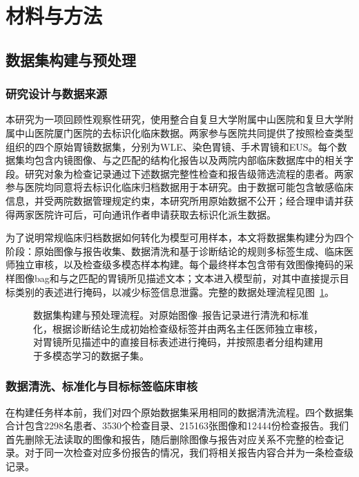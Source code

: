 \documentclass[Afour,sagev,times]{sagej}
\begin{document}
\section{材料与方法}

\subsection{数据集构建与预处理}

\subsubsection{研究设计与数据来源}

本研究为一项回顾性观察性研究，使用整合自复旦大学附属中山医院和复旦大学附属中山医院厦门医院的去标识化临床数据。两家参与医院共同提供了按照检查类型组织的四个原始胃镜数据集，分别为WLE、染色胃镜、手术胃镜和EUS。每个数据集均包含内镜图像、与之匹配的结构化报告以及两院内部临床数据库中的相关字段。研究对象为检查记录通过下述数据完整性检查和报告级筛选流程的患者。两家参与医院均同意将去标识化临床归档数据用于本研究。由于数据可能包含敏感临床信息，并受两院数据管理规定约束，本研究所用原始数据不公开；经合理申请并获得两家医院许可后，可向通讯作者申请获取去标识化派生数据。

为了说明常规临床归档数据如何转化为模型可用样本，本文将数据集构建分为四个阶段：原始图像与报告收集、数据清洗和基于诊断结论的规则多标签生成、临床医师独立审核，以及检查级多模态样本构建。每个最终样本包含带有效图像掩码的采样图像bag和与之匹配的胃镜所见描述文本；文本进入模型前，对其中直接提示目标类别的表述进行掩码，以减少标签信息泄露。完整的数据处理流程见图~\ref{fig:dataset_pipeline}。

\begin{figure}[t]
\centering
\caption{数据集构建与预处理流程。对原始图像--报告记录进行清洗和标准化，根据诊断结论生成初始检查级标签并由两名主任医师独立审核，对胃镜所见描述中的直接目标表述进行掩码，并按照患者分组构建用于多模态学习的数据子集。\label{fig:dataset_pipeline}}
\end{figure}

\subsubsection{数据清洗、标准化与目标标签临床审核}

在构建任务样本前，我们对四个原始数据集采用相同的数据清洗流程。四个数据集合计包含2298名患者、3530个检查目录、215163张图像和12444份检查报告。我们首先删除无法读取的图像和报告，随后删除图像与报告对应关系不完整的检查记录。对于同一次检查对应多份报告的情况，我们将相关报告内容合并为一条检查级记录。
\end{document}
